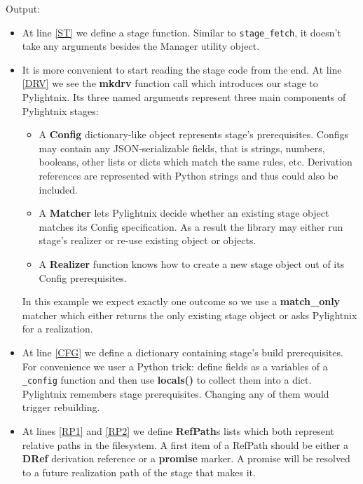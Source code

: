 \documentclass{article}
\begin{document}
Output:

\mysmallstdout


\begin{itemize}
  \item At line \ref{ST} we define a stage function. Similar to
    \texttt{stage\_fetch}, it doesn't take any arguments besides the
    Manager utility object.
  \item It is more convenient to start reading the stage code from the end.
    At line \ref{DRV} we see the \textbf{mkdrv} function call which
    introduces our stage to Pylightnix. Its three named arguments represent
    three main components of Pylightnix stages:
    \begin{itemize}
      \item A \textbf{Config} dictionary-like object represents stage's
        prerequisites. Configs may contain any JSON-serializable fields,
        that is strings, numbers, booleans, other lists or dicts which
        match the same rules, etc. Derivation references are represented
        with Python strings and thus could also be included.
      \item A \textbf{Matcher} lets Pylightnix decide whether an
        existing stage object matches its Config specification. As a result
        the library may either run stage's realizer or re-use existing
        object or objects.
      \item A \textbf{Realizer} function knows how to create a new
        stage object out of its Config prerequisites.
    \end{itemize}
    In this example we expect exactly one outcome so we use a
    \textbf{match\_only} matcher which either returns the only existing
    stage object or asks Pylightnix for a realization.

  \item At line \ref{CFG} we define a dictionary containing stage's build
    prerequisites. For convenience we user a Python trick: define fields as
    a variables of a \texttt{\_config} function and then use
    \textbf{locals()} to collect them into a dict. Pylightnix remembers
    stage prerequisites. Changing any of them would trigger rebuilding.

  \item At lines \ref{RP1} and \ref{RP2} we define \textbf{RefPath}s lists
    which both represent relative paths in the filesystem. A first item of
    a RefPath should be either a \textbf{DRef} derivation reference or
    a \textbf{promise} marker. A promise will be resolved to a future
    realization path of the stage that makes it.


\end{itemize}
\end{document}
